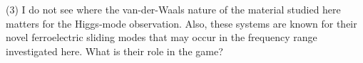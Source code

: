 (3) I do not see where the van-der-Waals nature of the material studied here matters for the Higgs-mode observation. Also, these systems are known for their novel ferroelectric sliding modes that may occur in the frequency range investigated here. What is their role in the game?
